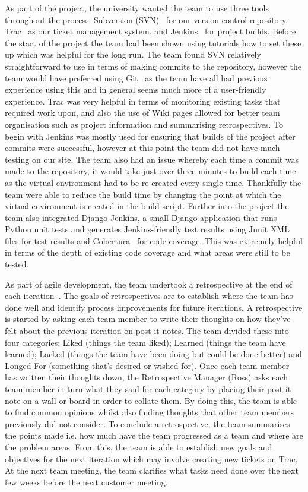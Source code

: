\documentclass{l3proj}
\begin{document}
As part of the project, the university wanted the team to use three tools throughout the process: Subversion (SVN)~\cite{SVN} for our version control repository, Trac~\cite{Trac} as our ticket management system, and Jenkins~\cite{Jenkins} for project builds. Before the start of the project the team had been shown using tutorials how to set these up which was helpful for the long run. The team found SVN relatively straightforward to use in terms of making commits to the repository, however the team would have preferred using Git~\cite{Git} as the team have all had previous experience using this and in general seems much more of a user-friendly experience. Trac was very helpful in terms of monitoring existing tasks that required work upon, and also the use of Wiki pages allowed for better team organisation such as project information and summarising retrospectives. To begin with Jenkins was mostly used for ensuring that builds of the project after commits were successful, however at this point the team did not have much testing on our site. The team also had an issue whereby each time a commit was made to the repository, it would take just over three minutes to build each time as the virtual environment had to be re created every single time. Thankfully the team were able to reduce the build time by changing the point at which the virtual environment is created in the build script. Further into the project the team also integrated Django-Jenkins, a small Django application that runs Python unit tests and generates Jenkins-friendly test results using Junit XML files for test results and Cobertura~\cite{Cobertura} for code coverage. This was extremely helpful in terms of the depth of existing code coverage and what areas were still to be tested.

As part of agile development, the team undertook a retrospective at the end of each iteration~\cite{Retrospectives}. The goals of retrospectives are to establish where the team has done well and identify process improvements for future iterations. A retrospective is started by asking each team member to write their thoughts on how they've felt about the previous iteration on post-it notes. The team divided these into four categories: Liked (things the team liked); Learned (things the team have learned); Lacked (things the team have been doing but could be done better) and Longed For (something that's desired or wished for). Once each team member has written their thoughts down, the Retrospective Manager (Ross) asks each team member in turn what they said for each category by placing their post-it note on a wall or board in order to collate them. By doing this, the team is able to find common opinions whilst also finding thoughts that other team members previously did not consider. To conclude a retrospective, the team summarises the points made i.e. how much have the team progressed as a team and where are the problem areas. From this, the team is able to establish new goals and objectives for the next iteration which may involve creating new tickets on Trac. At the next team meeting, the team clarifies what tasks need done over the next few weeks before the next customer meeting.
\end{document}
